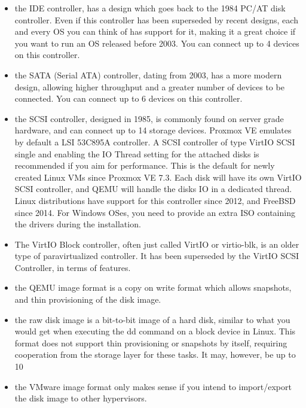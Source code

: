 \begin{itemize}[leftmargin=2cm]

	\item the IDE controller, has a design which goes back to the 1984 PC/AT disk controller. Even if this controller has been superseded by recent designs, each and every OS you can think of has support for it, making it a great choice if you want to run an OS released before 2003. You can connect up to 4 devices on this controller.

	\item the SATA (Serial ATA) controller, dating from 2003, has a more modern design, allowing higher throughput and a greater number of devices to be connected. You can connect up to 6 devices on this controller.

	\item the SCSI controller, designed in 1985, is commonly found on server grade hardware, and can connect up to 14 storage devices. Proxmox VE emulates by default a LSI 53C895A controller. A SCSI controller of type VirtIO SCSI single and enabling the IO Thread setting for the attached disks is recommended if you aim for performance. This is the default for newly created Linux VMs since Proxmox VE 7.3. Each disk will have its own VirtIO SCSI controller, and QEMU will handle the disks IO in a dedicated thread. Linux distributions have support for this controller since 2012, and FreeBSD since 2014. For Windows OSes, you need to provide an extra ISO containing the drivers during the installation.

	\item The VirtIO Block controller, often just called VirtIO or virtio-blk, is an older type of paravirtualized controller. It has been superseded by the VirtIO SCSI Controller, in terms of features.

\end{itemize}

\begin{itemize}[leftmargin=2cm]

	\item the QEMU image format is a copy on write format which allows snapshots, and thin provisioning of the disk image.

	\item the raw disk image is a bit-to-bit image of a hard disk, similar to what you would get when executing the dd command on a block device in Linux. This format does not support thin provisioning or snapshots by itself, requiring cooperation from the storage layer for these tasks. It may, however, be up to 10%

	\item the VMware image format only makes sense if you intend to import/export the disk image to other hypervisors.

\end{itemize}


